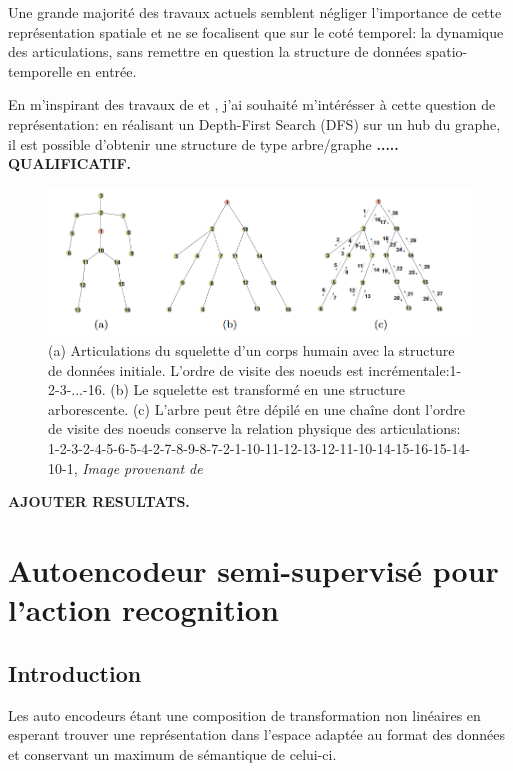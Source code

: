 Une grande majorité des travaux actuels semblent négliger l'importance de cette représentation spatiale et ne se focalisent que sur le coté temporel: la dynamique des articulations, sans remettre en question la structure de données spatio-temporelle en entrée.

En m'inspirant des travaux de \cite{liu2016spatio} et \cite{2018arXiv180110304Y}, j'ai souhaité m'intérésser à cette question de représentation: en réalisant un Depth-First Search (DFS) sur un hub du graphe, il est possible d'obtenir une structure de type arbre/graphe\textbf{ ..... QUALIFICATIF.}

\begin{figure}[H]
    \centering
    \includegraphics[width=1\linewidth]{Images/DFS.png}
    \caption{(a) Articulations du squelette d'un corps humain avec la structure de données initiale. L'ordre de visite des noeuds est incrémentale:1-2-3-...-16. (b) Le squelette est transformé en une structure arborescente. (c)  L'arbre peut être dépilé en une chaîne dont l'ordre de visite des noeuds conserve la relation physique des articulations: 1-2-3-2-4-5-6-5-4-2-7-8-9-8-7-2-1-10-11-12-13-12-11-10-14-15-16-15-14-10-1, \textit{Image provenant de\cite{liu2016spatio}}}
    \label{fig:DFS}
\end{figure}

\textbf{AJOUTER RESULTATS.}


\section{Autoencodeur semi-supervisé pour l'action recognition}

\subsection{Introduction}
Les auto encodeurs étant une composition de transformation non linéaires en esperant trouver une représentation dans l'espace adaptée au format des données et conservant un maximum de sémantique de celui-ci.

